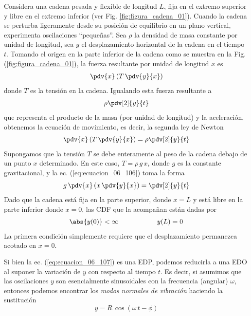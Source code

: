 Considera una cadena pesada y flexible de longitud $L$, fija en el extremo superior y libre en el extremo inferior (ver Fig. \ref{fig:figura_cadena_01}). Cuando la cadena se perturba ligeramente desde su posición de equilibrio en un plano vertical, experimenta oscilaciones \enquote{pequeñas}. Sea $\rho$ la densidad de masa constante por unidad de longitud, sea $y$ el desplazamiento horizontal de la cadena en el tiempo $t$. Tomando el origen en la parte inferior de la cadena como se muestra en la Fig. (\ref{fig:figura_cadena_01}), la fuerza resultante por unidad de longitud $x$ es
\begin{align*}
\pdv{x} \left( T \, \pdv{y}{x} \right)
\end{align*}
donde $T$ es la tensión en la cadena. Igualando esta fuerza resultante a
\begin{align*}
\rho \pdv[2]{y}{t}
\end{align*}
que representa el producto de la masa (por unidad de longitud) y la aceleración, obtenemos la ecuación de movimiento, es decir, la segunda ley de Newton
\begin{equation}
\pdv{x} \left( T \, \pdv{y}{x} \right) = \rho \pdv[2]{y}{t}
\label{eq:ecuacion_06_106}
\end{equation}
Supongamos que la tensión $T$ se debe enteramente al peso de la cadena debajo de un punto $x$ determinado. En este caso, $T = \rho \, g \, x$, donde $g$ es la constante gravitacional, y la ec. (\ref{eq:ecuacion_06_106}) toma la forma
\begin{equation}
g \, \pdv{x} \left( x \, \pdv{y}{x} \right) = \pdv[2]{y}{t}
\label{eq:ecuacion_06_107}
\end{equation}
Dado que la cadena está fija en la parte superior, donde $x = L$ y está libre en la parte inferior donde $x = 0$, las CDF que la acompañan están dadas por
\begin{equation}
\abs{y(0)} < \infty \hspace{2cm} y(L) = 0
\label{eq:ecuacion_06_108}
\end{equation}
La primera condición simplemente requiere que el desplazamiento permanezca acotado en $x = 0$.
\par
Si bien la ec. (\ref{eq:ecuacion_06_107}) es una EDP, podemos reducirla a una EDO al suponer la variación de $y$ con respecto al tiempo $t$. Es decir, si asumimos que las oscilaciones $y$ son esencialmente sinusoidales con la frecuencia (angular) $\omega$, entonces podemos encontrar los \emph{modos normales de vibración} haciendo la sustitución
\begin{equation}
y =  R \, \cos (\omega \, t - \phi)
\label{eq:ecuacion_06_109}
\end{equation}
